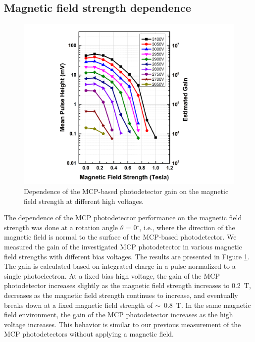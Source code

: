 \documentclass[preprint,5p]{elsarticle}
\begin{document}
\subsection{Magnetic field strength dependence}\label{subsec_HV}
\begin{figure}[tbp]
\hspace{-1.0 cm} 
\includegraphics[scale=0.1]{fig/MCPs_gain_B_HV.png}
\caption{Dependence of the MCP-based photodetector gain on the magnetic field 
strength at different high voltages.} \label{fig:MCPs_gain_B_HV}
\end{figure}

The dependence of the MCP photodetector performance on the magnetic field 
strength was done at a rotation angle $\theta$ = 0$^{\circ}$, i.e., where the 
direction of the magnetic field is normal to the surface of the MCP-based 
photodetector. We measured the gain of the investigated MCP photodetector in 
various magnetic field strengths with different bias voltages. The results are 
presented in Figure \ref{fig:MCPs_gain_B_HV}. The gain is calculated based on 
integrated charge in a pulse normalized to a single photoelectron. At a fixed 
bias high voltage, the gain of the MCP photodetector increases slightly as the 
magnetic field strength increases to 0.2~T, decreases as the magnetic field 
strength continues to increase, and eventually breaks down at a fixed magnetic 
field strength of $\sim$~0.8~T. In the same magnetic field environment, the 
gain of the MCP photodetector increases as the high voltage increases. This 
behavior is similar to our previous measurement of the MCP photodetectors 
without applying a magnetic field. 
\end{document}
